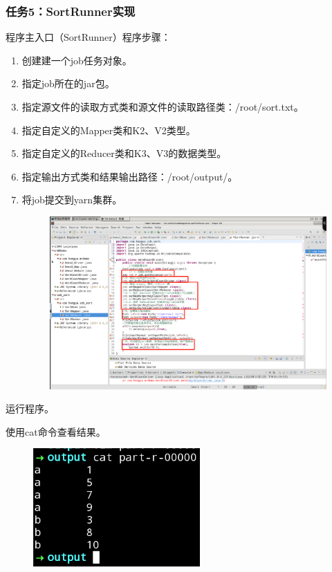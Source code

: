 \documentclass {article}
\begin{document}
			\subsubsection{任务5：SortRunner实现}
				程序主入口（SortRunner）程序步骤：
				\begin{enumerate}
					\item 创建建一个job任务对象。
					\item 指定job所在的jar包。
					\item 指定源文件的读取方式类和源文件的读取路径类：/root/sort.txt。
					\item 指定自定义的Mapper类和K2、V2类型。
					\item 指定自定义的Reducer类和K3、V3的数据类型。
					\item 指定输出方式类和结果输出路径：/root/output/。
					\item 将job提交到yarn集群。
					\begin{figure}[H]
						\centering
						\includegraphics[width=4.5in]{figures/fig6.png}
					\end{figure}
				\end{enumerate}
			
				运行程序。
				
				使用cat命令查看结果。
				\begin{figure}[H]
					\centering
					\includegraphics{figures/fig7.png}
				\end{figure}
			
\end{document}
